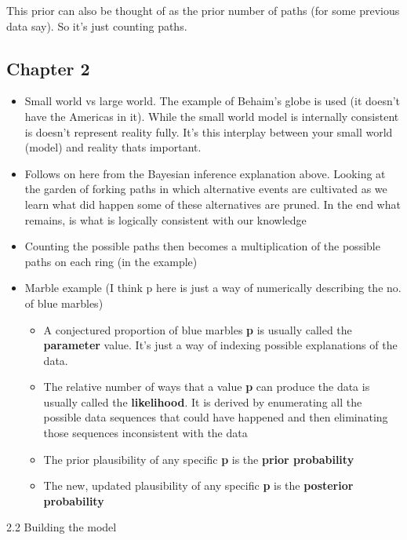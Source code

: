 \documentclass[11pt]{article}
\begin{document}
This prior can also be thought of as the prior number of paths (for some
previous data say). So it's just counting paths.

\hypertarget{chapter-2-1}{%
\subsection{Chapter 2}\label{chapter-2-1}}

\begin{itemize}
\tightlist
\item
  Small world vs large world. The example of Behaim's globe is used (it
  doesn't have the Americas in it). While the small world model is
  internally consistent is doesn't represent reality fully. It's this
  interplay between your small world (model) and reality thats
  important.
\item
  Follows on here from the Bayesian inference explanation above. Looking
  at the garden of forking paths in which alternative events are
  cultivated as we learn what did happen some of these alternatives are
  pruned. In the end what remains, is what is logically consistent with
  our knowledge
\item
  Counting the possible paths then becomes a multiplication of the
  possible paths on each ring (in the example)
\item
  Marble example (I think p here is just a way of numerically describing
  the no. of blue marbles)

  \begin{itemize}
  \tightlist
  \item
    A conjectured proportion of blue marbles \textbf{p} is usually
    called the \textbf{parameter} value. It's just a way of indexing
    possible explanations of the data.
  \item
    The relative number of ways that a value \textbf{p} can produce the
    data is usually called the \textbf{likelihood}. It is derived by
    enumerating all the possible data sequences that could have happened
    and then eliminating those sequences inconsistent with the data
  \item
    The prior plausibility of any specific \textbf{p} is the
    \textbf{prior probability}
  \item
    The new, updated plausibility of any specific \textbf{p} is the
    \textbf{posterior probability}
  \end{itemize}
\end{itemize}

2.2 Building the model
\end{document}
